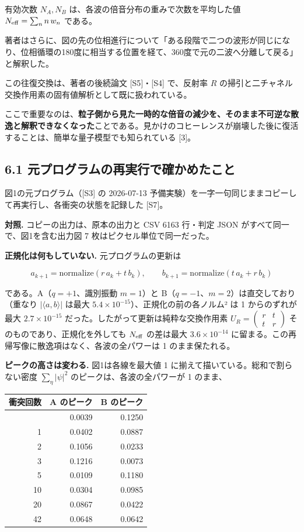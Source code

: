 \documentclass[
  a4paper,
]{ltjsarticle}
\newcounter{none} %
\begin{document}
有効次数 \(N_A,N_B\) は、各波の倍音分布の重みで次数を平均した値
\(N_{\rm eff}=\sum_n n\,w_n\) である。

著者はさらに、図の先の位相進行について「ある段階で二つの波形が同じになり、位相循環の180度に相当する位置を経て、360度で元の二波へ分離して戻る」と解釈した。

この往復交換は、著者の後続論文 {[}S5{]}・{[}S4{]} で、反射率 \(R\)
の掃引と二チャネル交換作用素の固有値解析として既に扱われている。

ここで重要なのは、\textbf{粒子側から見た一時的な倍音の減少を、そのまま不可逆な散逸と解釈できなくなった}ことである。見かけのコヒーレンスが崩壊した後に復活することは、簡単な量子模型でも知られている
{[}3{]}。

\subsection{6.1
元プログラムの再実行で確かめたこと}\label{ux5143ux30d7ux30edux30b0ux30e9ux30e0ux306eux518dux5b9fux884cux3067ux78baux304bux3081ux305fux3053ux3068}

図1の元プログラム（{[}S3{]} の 2026-07-13
予備実験）を一字一句同じままコピーして再実行し、各衝突の状態を記録した
{[}S7{]}。

\textbf{対照.} コピーの出力は、原本の出力と CSV 6163 行・判定 JSON
がすべて同一で、図1を含む出力図 7 枚はピクセル単位で同一だった。

\textbf{正規化は何もしていない.} 元プログラムの更新は

\[
a_{k+1}=\mathrm{normalize}(r\,a_k+t\,b_k),\qquad b_{k+1}=\mathrm{normalize}(t\,a_k+r\,b_k)
\]

である。A（\(q=+1\)、識別振動 \(m=1\)）と
B（\(q=-1\)、\(m=2\)）は直交しており（重なり \(|\langle a,b\rangle|\)
は最大 \(5.4\times10^{-15}\)）、正規化の前の各ノルム² は 1
からのずれが最大 \(2.7\times10^{-15}\)
だった。したがって更新は純粋な交換作用素
\(U_R=\begin{pmatrix}r&t\\t&r\end{pmatrix}\)
そのものであり、正規化を外しても \(N_{\rm eff}\) の差は最大
\(3.6\times10^{-14}\)
に留まる。この再帰写像に散逸項はなく、各波の全パワーは 1
のまま保たれる。

\textbf{ピークの高さは変わる.} 図1は各線を最大値 1
に揃えて描いている。総和で割らない密度 \(\sum_\eta|\psi|^2\)
のピークは、各波の全パワーが 1 のまま、

{\def\LTcaptype{none} %
\begin{longtable}[]{@{}rrr@{}}
\toprule\noalign{}
衝突回数 & A のピーク & B のピーク \\
\midrule\noalign{}
\endhead
\bottomrule\noalign{}
\endlastfoot
0 & 0.0039 & 0.1250 \\
1 & 0.0402 & 0.0887 \\
2 & 0.1056 & 0.0233 \\
3 & 0.1216 & 0.0073 \\
5 & 0.0109 & 0.1180 \\
10 & 0.0304 & 0.0985 \\
20 & 0.0867 & 0.0422 \\
42 & 0.0648 & 0.0642 \\
\end{longtable}
}
\end{document}
